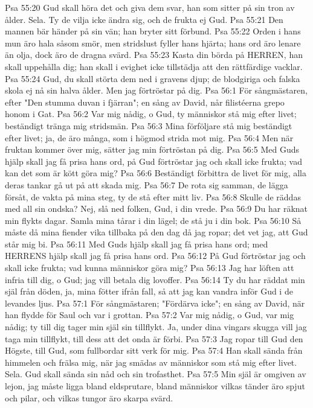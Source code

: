 Psa 55:20  Gud skall höra det och giva dem svar, han som sitter på sin tron av ålder. Sela. Ty de vilja icke ändra sig, och de frukta ej Gud.
Psa 55:21  Den mannen bär händer på sin vän; han bryter sitt förbund.
Psa 55:22  Orden i hans mun äro hala såsom smör, men stridslust fyller hans hjärta; hans ord äro lenare än olja, dock äro de dragna svärd.
Psa 55:23  Kasta din börda på HERREN, han skall uppehålla dig; han skall i evighet icke tillstädja att den rättfärdige vacklar.
Psa 55:24  Gud, du skall störta dem ned i gravens djup; de blodgiriga och falska skola ej nå sin halva ålder. Men jag förtröstar på dig.
Psa 56:1  För sångmästaren, efter "Den stumma duvan i fjärran"; en sång av David, når filistéerna grepo honom i Gat.
Psa 56:2  Var mig nådig, o Gud, ty människor stå mig efter livet; beständigt tränga mig stridsmän.
Psa 56:3  Mina förföljare stå mig beständigt efter livet; ja, de äro många, som i högmod strida mot mig.
Psa 56:4  Men när fruktan kommer över mig, sätter jag min förtröstan på dig.
Psa 56:5  Med Guds hjälp skall jag få prisa hans ord, på Gud förtröstar jag och skall icke frukta; vad kan det som är kött göra mig?
Psa 56:6  Beständigt förbittra de livet för mig, alla deras tankar gå ut på att skada mig.
Psa 56:7  De rota sig samman, de lägga försåt, de vakta på mina steg, ty de stå efter mitt liv.
Psa 56:8  Skulle de räddas med all sin ondska? Nej, slå ned folken, Gud, i din vrede.
Psa 56:9  Du har räknat min flykts dagar. Samla mina tårar i din lägel; de stå ju i din bok.
Psa 56:10  Så måste då mina fiender vika tillbaka på den dag då jag ropar; det vet jag, att Gud står mig bi.
Psa 56:11  Med Guds hjälp skall jag få prisa hans ord; med HERRENS hjälp skall jag få prisa hans ord.
Psa 56:12  På Gud förtröstar jag och skall icke frukta; vad kunna människor göra mig?
Psa 56:13  Jag har löften att infria till dig, o Gud; jag vill betala dig lovoffer.
Psa 56:14  Ty du har räddat min själ från döden, ja, mina fötter ifrån fall, så att jag kan vandra inför Gud i de levandes ljus.
Psa 57:1  För sångmästaren; "Fördärva icke"; en sång av David, när han flydde för Saul och var i grottan.
Psa 57:2  Var mig nådig, o Gud, var mig nådig; ty till dig tager min själ sin tillflykt. Ja, under dina vingars skugga vill jag taga min tillflykt, till dess att det onda är förbi.
Psa 57:3  Jag ropar till Gud den Högste, till Gud, som fullbordar sitt verk för mig.
Psa 57:4  Han skall sända från himmelen och frälsa mig, när jag smädas av människor som stå mig efter livet. Sela. Gud skall sända sin nåd och sin trofasthet.
Psa 57:5  Min själ är omgiven av lejon, jag måste ligga bland eldsprutare, bland människor vilkas tänder äro spjut och pilar, och vilkas tungor äro skarpa svärd.
